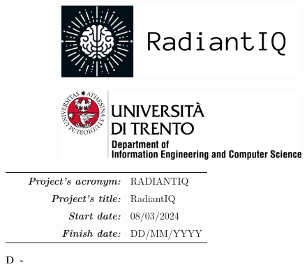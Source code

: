 \thispagestyle{empty}

\begin{center}

\begin{figure}
\centering
  \begin{subfigure}[b]{0.4\textwidth}
    \includegraphics[width=0.7\linewidth]{images/radiantiq}
  \end{subfigure}
 \hfill
  \begin{subfigure}[b]{0.4\textwidth}
    \includegraphics[width=0.8\linewidth]{images/unitn}
  \end{subfigure}
\end{figure}

\vspace{1.5cm}



{\setlength{\extrarowheight}{2pt}
\begin{tabular}{|rp{10cm}|}
\hline
\textcolor{RFIGreen}{\small\bf\em ~~~Project's acronym:} & {\small RADIANTIQ}\\

\textcolor{RFIGreen}{\small\bf\em Project's title:} & {\small RadiantIQ}\\

\textcolor{RFIGreen}{\small\bf\em Start date:} & {\small 08/03/2024}\\
\textcolor{RFIGreen}{\small\bf\em Finish date:} & {\small DD/MM/YYYY}\\
\hline
\end{tabular}
}
\vspace{2cm}

{\huge\bf D\theDeliverableNumber\ - \theDeliverableTitle}

\vspace{2cm}


\end{center}
